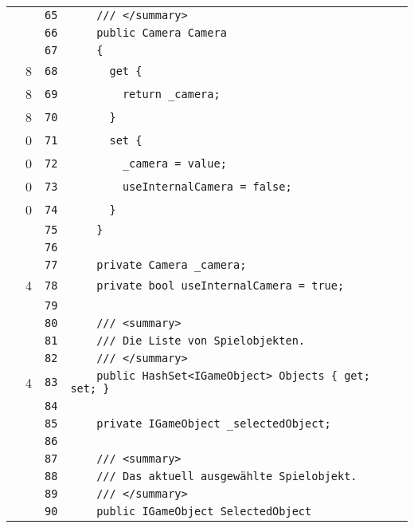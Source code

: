 \documentclass[a4paper,10pt]{article}
\begin{document}
\begin{longtable}[l]{lrrl}
\cellcolor{gray} &  & \verb~65~ & \verb~    /// </summary>~\\
\cellcolor{gray} &  & \verb~66~ & \verb~    public Camera Camera~\\
\cellcolor{gray} &  & \verb~67~ & \verb~    {~\\
\cellcolor{green} & 8 & \verb~68~ & \verb~      get {~\\
\cellcolor{green} & 8 & \verb~69~ & \verb~        return _camera;~\\
\cellcolor{green} & 8 & \verb~70~ & \verb~      }~\\
\cellcolor{red} & 0 & \verb~71~ & \verb~      set {~\\
\cellcolor{red} & 0 & \verb~72~ & \verb~        _camera = value;~\\
\cellcolor{red} & 0 & \verb~73~ & \verb~        useInternalCamera = false;~\\
\cellcolor{red} & 0 & \verb~74~ & \verb~      }~\\
\cellcolor{gray} &  & \verb~75~ & \verb~    }~\\
\cellcolor{gray} &  & \verb~76~ & \verb~~\\
\cellcolor{gray} &  & \verb~77~ & \verb~    private Camera _camera;~\\
\cellcolor{green} & 4 & \verb~78~ & \verb~    private bool useInternalCamera = true;~\\
\cellcolor{gray} &  & \verb~79~ & \verb~~\\
\cellcolor{gray} &  & \verb~80~ & \verb~    /// <summary>~\\
\cellcolor{gray} &  & \verb~81~ & \verb~    /// Die Liste von Spielobjekten.~\\
\cellcolor{gray} &  & \verb~82~ & \verb~    /// </summary>~\\
\cellcolor{green} & 4 & \verb~83~ & \verb~    public HashSet<IGameObject> Objects { get; set; }~\\
\cellcolor{gray} &  & \verb~84~ & \verb~~\\
\cellcolor{gray} &  & \verb~85~ & \verb~    private IGameObject _selectedObject;~\\
\cellcolor{gray} &  & \verb~86~ & \verb~~\\
\cellcolor{gray} &  & \verb~87~ & \verb~    /// <summary>~\\
\cellcolor{gray} &  & \verb~88~ & \verb~    /// Das aktuell ausgewählte Spielobjekt.~\\
\cellcolor{gray} &  & \verb~89~ & \verb~    /// </summary>~\\
\cellcolor{gray} &  & \verb~90~ & \verb~    public IGameObject SelectedObject~\\

\end{longtable}
\end{document}
